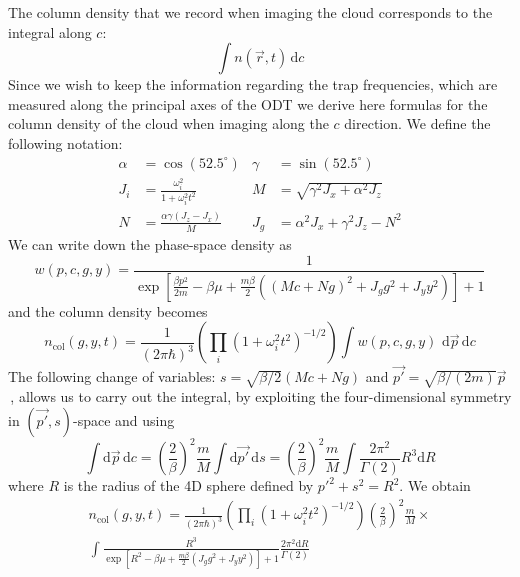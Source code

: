 The column density that we record when imaging the cloud corresponds to the
integral along $c$:
\begin{equation}
\int  n( \vec{r}, t) \,\mathrm{d} c
\end{equation} 
Since we wish to keep the information regarding the trap frequencies, which are
measured along the principal axes of the ODT we derive here formulas for the
column density of the cloud when imaging along the $c$ direction.  We define
the following notation:
\begin{align}
 \alpha & = \cos(52.5^{\circ}) & \gamma & = \sin(52.5^{\circ}) \\ 
J_{i} & = \frac{\omega_{i}^{2}}{1+\omega_{i}^{2} t^{2}} & 
M & = \sqrt{ \gamma^{2} J_{x} + \alpha^{2} J_{z} } \\
N & =  \frac{\alpha \gamma (J_{z} - J_{x}) }{M} & 
J_{g} & = \alpha^{2} J_{x} + \gamma^{2} J_{z} - N^{2}
\end{align}
We can write down the phase-space density as 
\begin{equation}
w(p,c,g,y) = \frac{1}
      {\exp\left[ \frac{\beta p^{2}}{2m} - \beta\mu + 
   \frac{m\beta}{2}( (M c + Ng)^{2}+ J_{g}g^{2} + J_{y} y^{2} ) \right] + 1   }
\end{equation}
and the column density becomes 
\begin{equation}
n_{\mathrm{col}}(g,y,t) = 
    \frac{ 1 } { (2\pi\hbar)^{3}}  
  \left(\prod_{i} (1 + \omega_{i}^{2}t^{2})^{-1/2} \right) 
   \int w(p,c,g,y)\,\, \mathrm{d} \vec{p}\, \mathrm{d}{c} 
\label{eq:ncol_int}
\end{equation}
The following change of variables: $s=\sqrt{\beta/2} (M c + Ng)$  and $\vec{p'}
= \sqrt{\beta/(2m)} \vec{p}$\,,  allows us to carry out the integral, by
exploiting the four-dimensional symmetry in $(\vec{p'},s)$-space and using 
\begin{equation}
\int \mathrm{d} \vec{p}\, \mathrm{d}{c} = 
   \left(\frac{2}{\beta}\right)^{2}\frac{m}{M} 
       \int \mathrm{d} \vec{p'}\, \mathrm{d}{s} 
   = \left(\frac{2}{\beta}\right)^{2}\frac{m}{M} 
    \int  \frac{2 \pi^{2}}{\Gamma(2)} R^{3} \mathrm{d} R
\end{equation}
where $R$ is the radius of the 4D sphere defined by $p'^{2} + s^{2} = R^{2}$.
We obtain
\begin{multline}
n_{\mathrm{col}}(g,y,t) =  
  \frac{ 1 } { (2\pi\hbar)^{3}}  
   \left(\prod_{i} (1 + \omega_{i}^{2}t^{2})^{-1/2} \right)  
  \left(\frac{2}{\beta}\right)^{2}\frac{m}{M}  
  \times  \\  \int  \frac{R^{3}}{\exp\left[ R^{2} - \beta\mu 
      + \frac{m\beta}{2}( J_{g}g^{2} + J_{y} y^{2} ) \right] + 1   } 
      \frac{ 2\pi^{2} \mathrm{d} R}{\Gamma(2)}
\end{multline}
